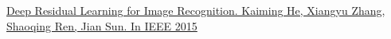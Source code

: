 \begin{thebibliography}{0}

\hypertarget{resnet}{}
    \href{https://arxiv.org/abs/1512.03385}
    {
        Deep Residual Learning for Image Recognition.
        Kaiming He, Xiangyu Zhang, Shaoqing Ren, Jian Sun.
        In IEEE 2015
    }

\end{thebibliography}

